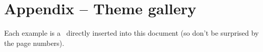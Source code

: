 \documentclass{tutodoc}
\begin{document}
\bgroup
    \section*{Appendix -- Theme gallery}%
    \label{tutodoc-theme-gallery}
\egroup

\bigskip\bigskip

\begin{tdocnote}
    Each example is a \pdf\ directly inserted into this document (so don't be surprised by the page numbers).
\end{tdocnote}
\end{document}
